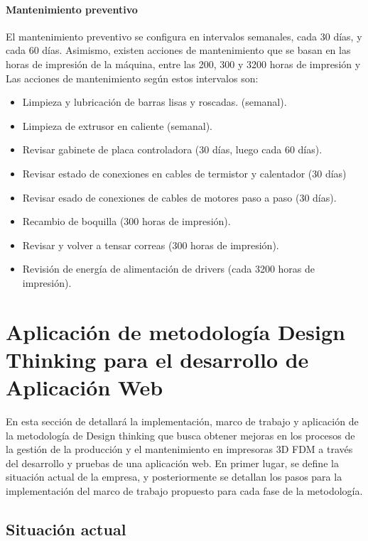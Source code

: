 \paragraph{Mantenimiento preventivo} El mantenimiento preventivo se configura en intervalos semanales, cada 30 días, y cada 60 días. Asimismo, existen acciones de mantenimiento que se basan en las horas de impresión de la máquina, entre las 200, 300 y 3200 horas de impresión y Las acciones de mantenimiento según estos intervalos son:

\begin{itemize}
\item Limpieza y lubricación de barras lisas y roscadas. (semanal).
\item Limpieza de extrusor en caliente (semanal).
\item Revisar gabinete de placa controladora (30 días, luego cada 60 días).
\item Revisar estado de conexiones en cables de termistor y calentador (30 días)
\item Revisar esado de conexiones de cables de motores paso a paso (30 días).
\item Recambio de boquilla (300 horas de impresión).
\item Revisar y volver a tensar correas (300 horas de impresión).
\item Revisión de energía de alimentación de drivers (cada 3200 horas de impresión).
\end{itemize}




\section{Aplicación de metodología Design Thinking para el desarrollo de Aplicación Web}

En esta sección de detallará la implementación, marco de trabajo y aplicación de la metodología de Design thinking que busca obtener mejoras en los procesos de la gestión de la producción y el mantenimiento en impresoras 3D FDM a través del desarrollo y pruebas de una aplicación web. En primer lugar, se define la situación actual de la empresa, y posteriormente se detallan los pasos para la implementación del marco de trabajo propuesto para cada fase de la metodología.

\subsection{Situación actual}

